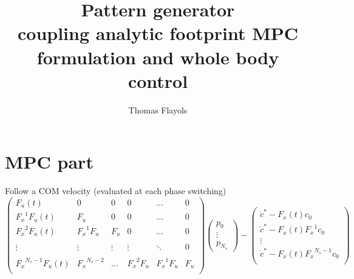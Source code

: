 \documentclass[10pt,a4paper]{article}
\begin{document}
\title{Pattern generator \\coupling analytic footprint MPC formulation and whole body control}
\author{Thomas Flayols}
\maketitle
\section*{MPC part}

    Follow a COM velocity (evaluated at each phase switching)
    \begin{equation}\label{min_velocity}
        \begin{pmatrix} 
             F_u(t)        		& 0 	 		& 0 &0& \hdots & 0 \\
             {F_x}^1 F_u(t) 		& F_u 	 		& 0 &0& \hdots & 0 \\
             {F_x}^2 F_u(t) 		& {F_x}^1 F_u 	& F_u &0& \hdots & 0 \\ \\
             \vdots	 			&\vdots 	& \vdots & \vdots &  \ddots & 0 \\ \\
             {F_x}^{N_s-1} F_u(t) 	&  {F_x}^{N_s-2}	& \hdots& {F_x}^2 F_u& {F_x}^1 F_u  & F_u \\
        \end{pmatrix}\begin{pmatrix} 
            p_0 \\
            \vdots \\
            p_{N_s}
        \end{pmatrix} - \begin{pmatrix} 
            \dot{c}^*-F_x(t) c_0\\
            \dot{c}^*-F_x(t){F_x}^1 c_0\\
            \vdots \\
            \dot{c}^*-F_x(t){F_x}^{N_s-1} c_0\\
        \end{pmatrix}
    \end{equation}
\end{document}
